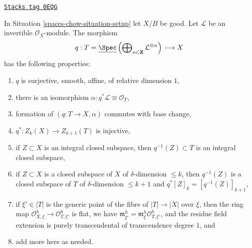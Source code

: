 \begin{lemma}[Gm torsor]
\label{spaces-chow-lemma-Gm-torsor}
\href{https://stacks.math.columbia.edu/tag/0EQG}{\texttt{Stacks tag 0EQG}}

In Situation \ref{spaces-chow-situation-setup} let $X/B$ be good.
Let $\mathcal{L}$ be an invertible $\mathcal{O}_X$-module.
The morphism
$$
q :
T = \underline{\Spec}\left(
\bigoplus\nolimits_{n \in \mathbf{Z}} \mathcal{L}^{\otimes n}\right)
\longrightarrow
X
$$
has the following properties:
\begin{enumerate}
\item $q$ is surjective, smooth, affine, of relative dimension $1$,
\item there is an isomorphism $\alpha : q^*\mathcal{L} \cong \mathcal{O}_T$,
\item formation of $(q : T \to X, \alpha)$ commutes with base change,
\item $q^* : Z_k(X) \to Z_{k + 1}(T)$ is injective,
\item if $Z \subset X$ is an integral closed subspace, then
$q^{-1}(Z) \subset T$ is an integral closed subspace,
\item if $Z \subset X$ is a closed subspace of $X$
of $\delta$-dimension $\leq k$, then $q^{-1}(Z)$ is a closed subspace of $T$
of $\delta$-dimension $\leq k + 1$ and
$q^*[Z]_k = [q^{-1}(Z)]_{k + 1}$,
\item if $\xi' \in |T|$ is the generic point of the fibre of $|T| \to |X|$
over $\xi$, then the ring map
$\mathcal{O}_{X, \xi}^h \to \mathcal{O}_{T, \xi'}^h$ is flat,
we have $\mathfrak m_{\xi'}^h = \mathfrak m_\xi^h \mathcal{O}_{T, \xi'}^h$, and
the residue field extension is purely transcendental of
transcendence degree $1$, and
\item add more here as needed.
\end{enumerate}
\end{lemma}

